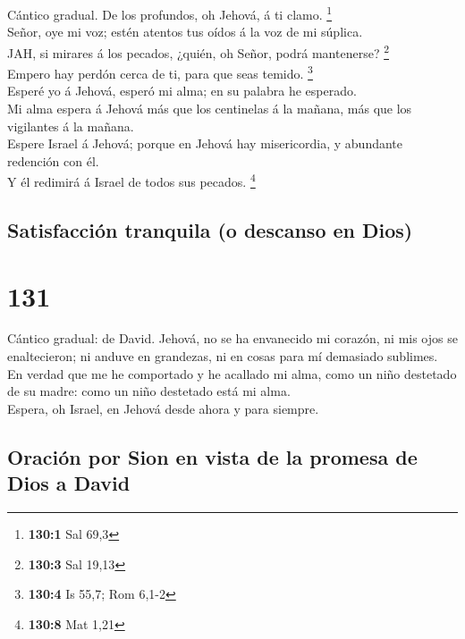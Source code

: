  Cántico gradual. De los profundos, oh Jehová, á ti clamo.
\footnote{\textbf{130:1} Sal 69,3}\\
 Señor, oye mi voz; estén atentos tus oídos á la voz de mi
súplica.\\
 JAH, si mirares á los pecados, ¿quién, oh Señor, podrá
mantenerse? \footnote{\textbf{130:3} Sal 19,13}\\
 Empero hay perdón cerca de ti, para que seas temido.
\footnote{\textbf{130:4} Is 55,7; Rom 6,1-2}\\
 Esperé yo á Jehová, esperó mi alma; en su palabra he
esperado.\\
 Mi alma espera á Jehová más que los centinelas á la mañana,
más que los vigilantes á la mañana.\\
 Espere Israel á Jehová; porque en Jehová hay misericordia,
y abundante redención con él.\\
 Y él redimirá á Israel de todos sus pecados. \footnote{\textbf{130:8}
  Mat 1,21}

\hypertarget{satisfacciuxf3n-tranquila-o-descanso-en-dios}{%
\subsection{Satisfacción tranquila (o descanso en
Dios)}\label{satisfacciuxf3n-tranquila-o-descanso-en-dios}}

\hypertarget{section-130}{%
\section{131}\label{section-130}}

 Cántico gradual: de David. Jehová, no se ha envanecido mi
corazón, ni mis ojos se enaltecieron; ni anduve en grandezas, ni en
cosas para mí demasiado sublimes.\\
 En verdad que me he comportado y he acallado mi alma, como
un niño destetado de su madre: como un niño destetado está mi alma.\\
 Espera, oh Israel, en Jehová desde ahora y para siempre.

\hypertarget{oraciuxf3n-por-sion-en-vista-de-la-promesa-de-dios-a-david}{%
\subsection{Oración por Sion en vista de la promesa de Dios a
David}\label{oraciuxf3n-por-sion-en-vista-de-la-promesa-de-dios-a-david}}

